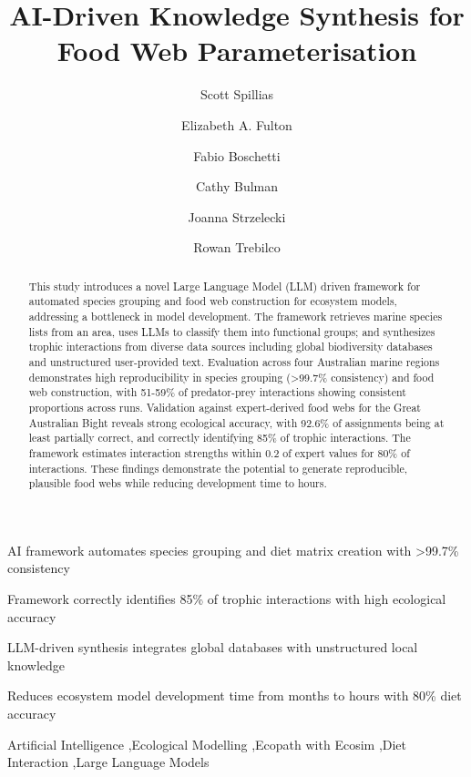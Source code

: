 \documentclass[final,12pt]{elsarticle}
\begin{document}
\begin{highlights}
\item AI framework automates species grouping and diet matrix creation with >99.7\% consistency
\item Framework correctly identifies 85\% of trophic interactions with high ecological accuracy
\item LLM-driven synthesis integrates global databases with unstructured local knowledge
\item Reduces ecosystem model development time from months to hours with 80\% diet accuracy
\end{highlights}

\title{AI-Driven Knowledge Synthesis for Food Web Parameterisation}

\author[1,2]{Scott Spillias}
\author[1,2]{Elizabeth A. Fulton}
\author[2,3,4]{Fabio Boschetti}
\author[1]{Cathy Bulman}
\author[3]{Joanna Strzelecki}
\author[1,2]{Rowan Trebilco}


\address[1]{CSIRO Environment, Hobart, Australia}
\address[2]{Centre for Marine Socio-Ecology, University of Tasmania, Hobart, Australia}
\address[3]{CSIRO Environment, IOMRC Crawley, Australia}
\address[4]{Oceans Institute, The University of Western Australia, Crawley, WA}

\begin{keyword}
Artificial Intelligence \sep Ecological Modelling \sep Ecopath with Ecosim \sep Diet Interaction \sep Large Language Models
\end{keyword}

\begin{abstract}
This study introduces a novel Large Language Model (LLM) driven framework for automated species grouping and food web construction for ecosystem models, addressing a bottleneck in model development. The framework retrieves marine species lists from an area, uses LLMs to classify them into functional groups; and synthesizes trophic interactions from diverse data sources including global biodiversity databases and unstructured user-provided text. Evaluation across four Australian marine regions demonstrates high reproducibility in species grouping (>99.7\% consistency) and food web construction, with 51-59\% of predator-prey interactions showing consistent proportions across runs. Validation against expert-derived food webs for the Great Australian Bight reveals strong ecological accuracy, with 92.6\% of assignments being at least partially correct, and correctly identifying 85\% of trophic interactions. The framework estimates interaction strengths within 0.2 of expert values for 80\% of interactions. These findings demonstrate the potential to generate reproducible, plausible food webs while reducing development time to hours.
\end{abstract}
\end{document}
